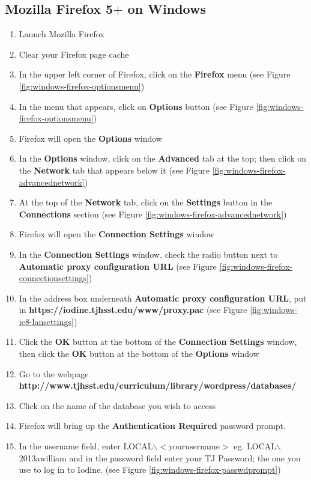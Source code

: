 \documentclass{article}
\newcommand{\proxypacurl}{https://iodine.tjhsst.edu/www/proxy.pac}
\newcommand{\librarydbpage}{http://www.tjhsst.edu/curriculum/library/wordpress/databases/}
\begin{document}
\begin{flushleft}
\section{Mozilla Firefox 5$+$ on Windows}
\begin{enumerate}
\item Launch Mozilla Firefox
\item Clear your Firefox page cache
\item In the upper left corner of Firefox, click on the \textbf{Firefox} menu (see Figure \ref{fig:windows-firefox-optionsmenu})
\item In the menu that appears, click on \textbf{Options} button (see Figure \ref{fig:windows-firefox-optionsmenu})
\item Firefox will open the \textbf{Options} window
\item In the \textbf{Options} window, click on the \textbf{Advanced} tab at the top; then click on the \textbf{Network} tab that appears below it (see Figure \ref{fig:windows-firefox-advancednetwork})
\item At the top of the \textbf{Network} tab, click on the \textbf{Settings} button in the \textbf{Connections} section (see Figure \ref{fig:windows-firefox-advancednetwork})
\item Firefox will open the \textbf{Connection Settings} window
\item In the \textbf{Connection Settings} window, check the radio button next to \textbf{Automatic proxy configuration URL} (see Figure \ref{fig:windows-firefox-connectionsettings})
\item In the address box underneath \textbf{Automatic proxy configuration URL}, put in \linebreak\textbf{\proxypacurl} (see Figure \ref{fig:windows-ie8-lansettings})
\item Click the \textbf{OK} button at the bottom of the \textbf{Connection Settings} window, then click the \textbf{OK} button at the bottom of the \textbf{Options} window
\item Go to the webpage \textbf{\librarydbpage}
\item Click on the name of the database you wish to access
\item Firefox will bring up the \textbf{Authentication Required} password prompt.
\item In the username field, enter LOCAL$\backslash$$<$yourusername$>$ eg. LOCAL$\backslash$2013awilliam and in the password field enter your TJ Password; the one you use to log in to Iodine. (see Figure \ref{fig:windows-firefox-passwdprompt})
$$
\end{enumerate}
\end{flushleft}
\end{document}
